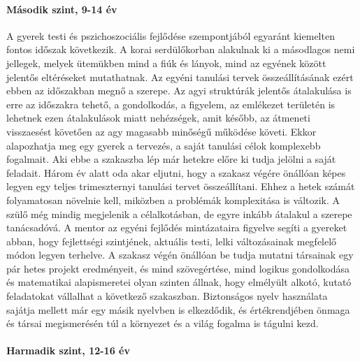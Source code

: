 \paragraph{Második szint, 9-14 év}

A gyerek testi és pszichoszociális fejlődése szempontjából egyaránt
kiemelten fontos időszak következik. A korai serdülőkorban alakulnak ki a
másodlagos nemi jellegek, melyek ütemükben mind a fiúk és lányok, mind az
egyének között jelentős eltéréseket mutathatnak. Az egyéni tanulási tervek
összeállításának ezért ebben az időszakban megnő a szerepe. Az agyi struktúrák
jelentős átalakulása is erre az időszakra tehető, a gondolkodás, a figyelem, az
emlékezet területén is lehetnek ezen átalakulások miatt nehézségek, amit
később, az átmeneti visszaesést követően az agy magasabb minőségű működése
követi. Ekkor alapozhatja meg egy gyerek a tervezés, a saját tanulási célok
komplexebb fogalmait. Aki ebbe a szakaszba lép már hetekre előre ki tudja
jelölni a saját feladait. Három év alatt oda akar eljutni, hogy a szakasz
végére önállóan képes legyen egy teljes trimeszternyi tanulási tervet
összeállítani. Ehhez a hetek számát folyamatosan növelnie kell, miközben a
problémák komplexitása is változik. A szülő még mindig megjelenik a
célalkotásban, de egyre inkább átalakul a szerepe tanácsadóvá. A mentor az
egyéni fejlődés mintázataira figyelve segíti a gyereket abban, hogy fejlettségi
szintjének, aktuális testi, lelki változásainak megfelelő módon legyen
terhelve.
A szakasz végén önállóan be tudja mutatni társainak egy pár hetes projekt
eredményeit, és mind szövegértése, mind logikus gondolkodása és matematikai
alapismeretei olyan szinten állnak, hogy elmélyült alkotó, kutató feladatokat
vállalhat a következő szakaszban. Biztonságos nyelv használata sajátja mellett
már egy másik nyelvben is elkezdődik, és értékrendjében önmaga és társai
megismerésén túl a környezet és a világ fogalma is tágulni kezd.

\paragraph{Harmadik szint, 12-16 év}

